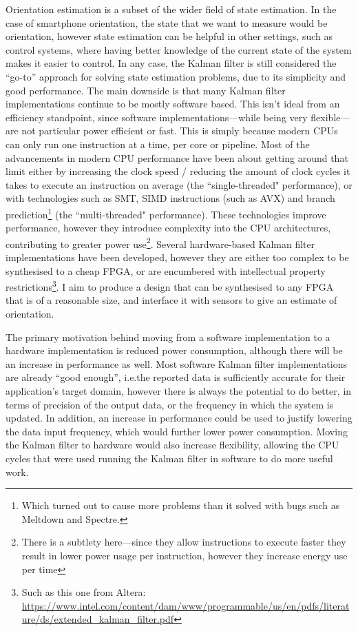 \documentclass[12pt]{article}
\begin{document}
Orientation estimation is a subset of the wider field of state estimation. In the case of smartphone orientation, the state that we want to measure would be orientation, however state estimation can be helpful in other settings, such as control systems, where having better knowledge of the current state of the system makes it easier to control. In any case, the Kalman filter is still considered the ``go-to'' approach for solving state estimation problems, due to its simplicity and good performance. The main downside is that many Kalman filter implementations continue to be mostly software based\cite{ayub_2012}. This isn't ideal from an efficiency standpoint, since software implementations---while being very flexible---are not particular power efficient or fast. This is simply because modern CPUs can only run one instruction at a time, per core or pipeline. Most of the advancements in modern CPU performance have been about getting around that limit either by increasing the clock speed / reducing the amount of clock cycles it takes to execute an instruction on average (the ``single-threaded" performance), or with technologies such as SMT, SIMD instructions (such as AVX) and branch prediction\footnote{Which turned out to cause more problems than it solved with bugs such as Meltdown and Spectre.} (the ``multi-threaded" performance). These technologies improve performance, however they introduce complexity into the CPU architectures, contributing to greater power use\footnote{There is a subtlety here---since they allow instructions to execute faster they result in lower power usage per instruction, however they increase energy use per time}. Several hardware-based Kalman filter implementations have been developed, however they are either too complex \cite{mills_2016} to be synthesised to a cheap FPGA, or are encumbered with intellectual property restrictions\footnote{Such as this one from Altera: \url{https://www.intel.com/content/dam/www/programmable/us/en/pdfs/literature/ds/extended_kalman_filter.pdf}}. I aim to produce a design that can be synthesised to any FPGA that is of a reasonable size, and interface it with sensors to give an estimate of orientation.

The primary motivation behind moving from a software implementation to a hardware implementation is reduced power consumption, although there will be an increase in performance as well. Most software Kalman filter implementations are already ``good enough'', i.e.\@ the reported data is sufficiently accurate for their application's target domain, however there is always the potential to do better, in terms of precision of the output data, or the frequency in which the system is updated. In addition, an increase in performance could be used to justify lowering the data input frequency, which would further lower power consumption. Moving the Kalman filter to hardware would also increase flexibility, allowing the CPU cycles that were used running the Kalman filter in software to do more useful work.
\end{document}
